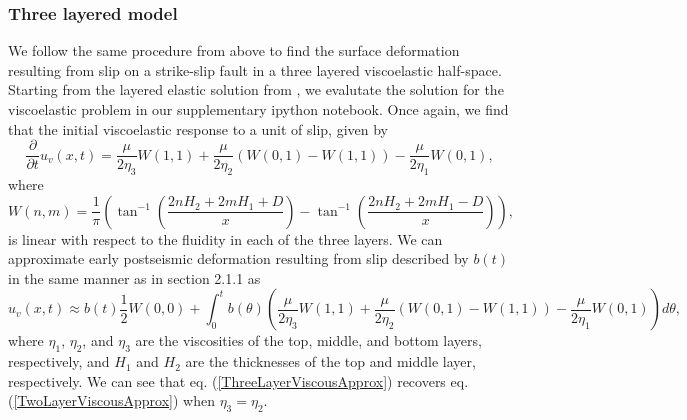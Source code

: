 \documentclass[extra]{gji}
\begin{document}
\subsubsection{Three layered model}
We follow the same procedure from above to find the surface
deformation resulting from slip on a strike-slip fault in a three
layered viscoelastic half-space.  Starting from the layered elastic
solution from \citet{CJ1972}, we evalutate the solution for the
viscoelastic problem in our supplementary ipython notebook. Once
again, we find that the initial viscoelastic response to a unit of
slip, given by
\begin{equation}\label{ThreeLayerViscousResponse}
\frac{\partial}{\partial t}u_v(x,t) = \frac{\mu}{2\eta_3}W(1,1)
                                      +\frac{\mu}{2\eta_2}(W(0,1) - W(1,1))
                                      -\frac{\mu}{2\eta_1}W(0,1),
\end{equation}
where
\begin{equation}
  W(n,m) = \frac{1}{\pi}\left(\tan^{-1}\left(\frac{2nH_2 + 2mH_1 + D}{x}\right) - 
                              \tan^{-1}\left(\frac{2nH_2 + 2mH_1 - D}{x}\right)\right),
\end{equation}
is linear with respect to the fluidity in each of the three layers.
We can approximate early postseismic deformation resulting from slip
described by $b(t)$ in the same manner as in section 2.1.1 as
\begin{equation}\label{ThreeLayerViscousApprox}
u_v(x,t) \approx b(t)\frac{1}{2} W(0,0) + 
         \int_0^tb(\theta)\left(\frac{\mu}{2\eta_3}W(1,1)
                               +\frac{\mu}{2\eta_2}(W(0,1) - W(1,1))
                               -\frac{\mu}{2\eta_1}W(0,1)\right)d\theta,
\end{equation}
where $\eta_1$, $\eta_2$, and $\eta_3$ are the viscosities of the top,
middle, and bottom layers, respectively, and $H_1$ and $H_2$ are the
thicknesses of the top and middle layer, respectively.  We can see
that eq. (\ref{ThreeLayerViscousApprox}) recovers eq.
(\ref{TwoLayerViscousApprox}) when $\eta_3 = \eta_2$.
\end{document}
